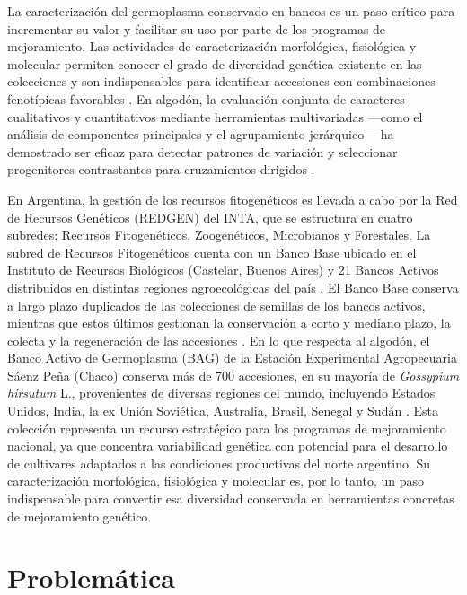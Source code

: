 \documentclass[12pt,oneside]{reedthesis}
\begin{document}
La caracterización del germoplasma conservado en bancos es un paso crítico para incrementar su valor y facilitar su uso por parte de los programas de mejoramiento. Las actividades de caracterización morfológica, fisiológica y molecular permiten conocer el grado de diversidad genética existente en las colecciones y son indispensables para identificar accesiones con combinaciones fenotípicas favorables \autocite{ruiz2024,hinze2025}. En algodón, la evaluación conjunta de caracteres cualitativos y cuantitativos mediante herramientas multivariadas ---como el análisis de componentes principales y el agrupamiento jerárquico--- ha demostrado ser eficaz para detectar patrones de variación y seleccionar progenitores contrastantes para cruzamientos dirigidos \autocite{spoljaric2018,anwar2025}.

En Argentina, la gestión de los recursos fitogenéticos es llevada a cabo por la Red de Recursos Genéticos (REDGEN) del INTA, que se estructura en cuatro subredes: Recursos Fitogenéticos, Zoogenéticos, Microbianos y Forestales. La subred de Recursos Fitogenéticos cuenta con un Banco Base ubicado en el Instituto de Recursos Biológicos (Castelar, Buenos Aires) y 21 Bancos Activos distribuidos en distintas regiones agroecológicas del país \autocite{ruiz2024}. El Banco Base conserva a largo plazo duplicados de las colecciones de semillas de los bancos activos, mientras que estos últimos gestionan la conservación a corto y mediano plazo, la colecta y la regeneración de las accesiones \autocite{ruiz2024}. En lo que respecta al algodón, el Banco Activo de Germoplasma (BAG) de la Estación Experimental Agropecuaria Sáenz Peña (Chaco) conserva más de 700 accesiones, en su mayoría de \emph{Gossypium hirsutum} L., provenientes de diversas regiones del mundo, incluyendo Estados Unidos, India, la ex Unión Soviética, Australia, Brasil, Senegal y Sudán \autocite{arriel2023}. Esta colección representa un recurso estratégico para los programas de mejoramiento nacional, ya que concentra variabilidad genética con potencial para el desarrollo de cultivares adaptados a las condiciones productivas del norte argentino. Su caracterización morfológica, fisiológica y molecular es, por lo tanto, un paso indispensable para convertir esa diversidad conservada en herramientas concretas de mejoramiento genético.

\section{Problemática}\label{problemuxe1tica}
\end{document}
